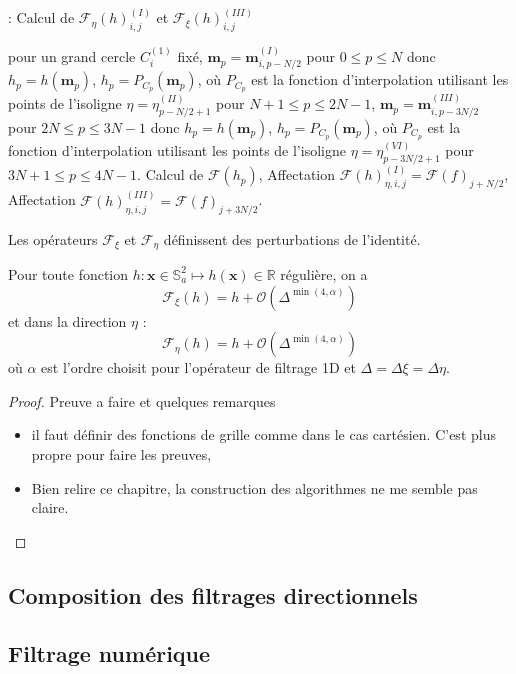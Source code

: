 \begin{center}
\begin{minipage}[H]{12cm}
  \begin{algorithm}[H]
    \caption{: Calcul de $\mathcal{F}_{\eta}(h)_{i,j}^{(I)}$ et $\mathcal{F}_{\xi}(h)_{i,j}^{(III)}$}\label{alg:ftreta}
    \begin{algorithmic}[1]
    \State pour un grand cercle $C_i^{(1)}$ fixé,
             \State  $\mathbf{m}_p = \mathbf{m}_{i,p-N/2}^{(I)}$ pour $0  \leq p \leq N$ donc $h_p = h(\mathbf{m}_p)$,
             \State $h_p = P_{C_p}(\mathbf{m}_p)$, où $P_{C_p}$ est la fonction d'interpolation utilisant les points de l'isoligne $\eta = \eta^{(II)}_{p-N/2+1}$ pour $N+1 \leq p \leq 2N-1$,
             \State  $\mathbf{m}_p = \mathbf{m}_{i,p-3N/2}^{(III)}$ pour $2N  \leq p \leq 3N-1$ donc $h_p = h(\mathbf{m}_p)$,
             \State $h_p = P_{C_p}(\mathbf{m}_p)$, où $P_{C_p}$ est la fonction d'interpolation utilisant les points de l'isoligne $\eta = \eta^{(VI)}_{p-3N/2+1}$ pour $3N+1 \leq p \leq 4N-1$.
            \EndFor
    \State Calcul de $\mathcal{F}(h_p)$,
    \State Affectation $\mathcal{F}(h)_{\eta,i,j}^{(I)} = \mathcal{F}(f)_{j+N/2}$,
    \State Affectation $\mathcal{F}(h)_{\eta,i,j}^{(III)} = \mathcal{F}(f)_{j+3N/2}$.
    \EndFor
    \end{algorithmic}
    \end{algorithm}
\end{minipage}
\end{center}

Les opérateurs $\mathcal{F}_{\xi}$ et $\mathcal{F}_{\eta}$ définissent des perturbations de l'identité.

\begin{proposition}
Pour toute fonction $h : \mathbf{x} \in \mathbb{S}_a^2 \mapsto h(\mathbf{x}) \in \mathbb{R}$ régulière, on a 
\begin{equation}
\mathcal{F}_{\xi}(h) = h + \mathcal{O}\left( \Delta^{\min(4,\alpha)} \right)
\end{equation}
et dans la direction $\eta$ :
\begin{equation}
\mathcal{F}_{\eta}(h) = h + \mathcal{O}\left( \Delta^{\min(4,\alpha)} \right)
\end{equation}
où $\alpha$ est l'ordre choisit pour l'opérateur de filtrage 1D et $\Delta = \Delta \xi = \Delta \eta$.
\end{proposition}

\begin{proof}
Preuve a faire et quelques remarques
\begin{itemize}
\item il faut définir des fonctions de grille comme dans le cas cartésien. C'est plus propre pour faire les preuves,
\item Bien relire ce chapitre, la construction des algorithmes ne me semble pas claire.
\end{itemize}
\end{proof}



\subsection{Composition des filtrages directionnels}

\subsection{Filtrage numérique}
